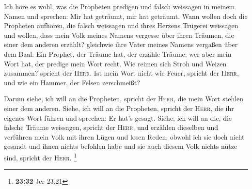  Ich höre es wohl, was die Propheten predigen und falsch
weissagen in meinem Namen und sprechen: Mir hat geträumt, mir hat
geträumt.  Wann wollen doch die Propheten aufhören, die
falsch weissagen und ihres Herzens Trügerei weissagen 
und wollen, dass mein Volk meines Namens vergesse über ihren Träumen,
die einer dem anderen erzählt? gleichwie ihre Väter meines Namens
vergaßen über dem Baal.  Ein Prophet, der Träume hat, der
erzähle Träume; wer aber mein Wort hat, der predige mein Wort recht. Wie
reimen sich Stroh und Weizen zusammen? spricht der \textsc{Herr}.
 Ist mein Wort nicht wie Feuer, spricht der
\textsc{Herr}, und wie ein Hammer, der Felsen zerschmeißt?

 Darum siehe, ich will an die Propheten, spricht der
\textsc{Herr}, die mein Wort stehlen einer dem anderen. 
Siehe, ich will an die Propheten, spricht der \textsc{Herr}, die ihr
eigenes Wort führen und sprechen: Er hat's gesagt. 
Siehe, ich will an die, die falsche Träume weissagen, spricht der
\textsc{Herr}, und erzählen dieselben und verführen mein Volk mit ihren
Lügen und losen Reden, obwohl ich sie doch nicht gesandt und ihnen
nichts befohlen habe und sie auch diesem Volk nichts nütze sind, spricht
der \textsc{Herr}. \footnote{\textbf{23:32} Jer 23,21}

